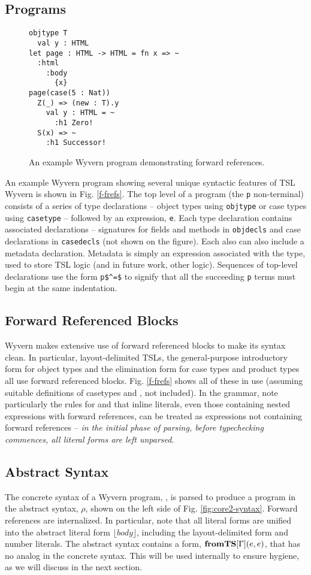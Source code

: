 \subsection{Programs}
\begin{figure}[h]
\begin{lstlisting}
objtype T
  val y : HTML
let page : HTML -> HTML = fn x => ~
  :html
    :body
      {x}
page(case(5 : Nat))
  Z(_) => (new : T).y
    val y : HTML = ~
      :h1 Zero!
  S(x) => ~
    :h1 Successor!
\end{lstlisting}
\caption{An example Wyvern program demonstrating forward references.}
\end{figure}
An example Wyvern program showing several unique syntactic features of TSL Wyvern is shown in Fig. \ref{f-frefs}. The top level of a program (the \lstinline{p} non-terminal) consists of a series of type declarations -- object types using \lstinline{objtype} or case types using \lstinline{casetype} -- followed by an expression, \lstinline{e}. Each type declaration contains associated declarations -- signatures for fields and methods in  \lstinline{objdecls} and case declarations in \lstinline{casedecls} (not shown on the figure). Each also can also include a metadata declaration. Metadata is simply an expression associated with the type, used to store TSL logic (and in future work, other logic). Sequences of top-level declarations use the form \lstinline{p$^=$} to signify that all the succeeding \lstinline{p} terms must begin at the same indentation.
\subsection{Forward Referenced Blocks}
Wyvern makes extensive use of forward referenced blocks to make its syntax clean. In particular, layout-delimited TSLs, the general-purpose introductory form for object types and the elimination form for case types and product types all use forward referenced blocks. Fig. \ref{f-frefs} shows all of these in use (assuming suitable definitions of casetypes  and , not included). In the grammar, note particularly the rules for  and that inline literals, even those containing nested expressions with forward references, can be treated as expressions not containing forward references -- \emph{in the initial phase of parsing, before typechecking commences, all literal forms are left unparsed}.

\subsection{Abstract Syntax}
The concrete syntax of a Wyvern program, , is parsed to produce a program in the abstract syntax, $\rho$, shown on the left side of Fig. \ref{fig:core2-syntax}. Forward references are internalized. In particular, note that all literal forms are unified into the abstract literal form $\lfloor body \rfloor$, including the layout-delimited form and number literals. The abstract syntax contains a form, $\textbf{fromTS}[\Gamma](e,e)$, that has no analog in the concrete syntax. This will be used internally to ensure hygiene, as we will discuss in the next section.

